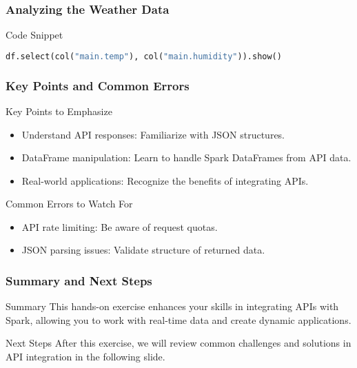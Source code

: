 \documentclass[aspectratio=169]{beamer}
\begin{document}
\begin{frame}[fragile]
    \frametitle{Analyzing the Weather Data}
    \begin{block}{Code Snippet}
        \begin{lstlisting}[language=Python]
        df.select(col("main.temp"), col("main.humidity")).show()
        \end{lstlisting}
    \end{block}
\end{frame}

\begin{frame}
    \frametitle{Key Points and Common Errors}
    \begin{block}{Key Points to Emphasize}
        \begin{itemize}
            \item Understand API responses: Familiarize with JSON structures.
            \item DataFrame manipulation: Learn to handle Spark DataFrames from API data.
            \item Real-world applications: Recognize the benefits of integrating APIs.
        \end{itemize}
    \end{block}
    
    \begin{block}{Common Errors to Watch For}
        \begin{itemize}
            \item API rate limiting: Be aware of request quotas.
            \item JSON parsing issues: Validate structure of returned data.
        \end{itemize}
    \end{block}
\end{frame}

\begin{frame}
    \frametitle{Summary and Next Steps}
    \begin{block}{Summary}
        This hands-on exercise enhances your skills in integrating APIs with Spark, allowing you to work with real-time data and create dynamic applications.
    \end{block}
    
    \begin{block}{Next Steps}
        After this exercise, we will review common challenges and solutions in API integration in the following slide.
    \end{block}
\end{frame}
\end{document}

